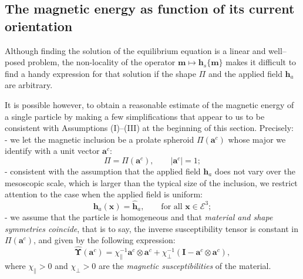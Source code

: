 \documentclass[oneside]{article}
\begin{document}
\subsection{The magnetic energy as function of its current orientation}

Although finding the solution of the equilibrium equation is a linear and well--posed problem, the non-locality of the operator $\bm m\mapsto\bm h_s\{\bm m\}$ makes it difficult to find a handy expression for that solution if the shape $\Pi$ and the applied field $\bm h_a$ are arbitrary. 


It is possible however, to obtain a reasonable estimate of the magnetic energy of a single particle by making a few simplifications that appear to us to be consistent with Assumptions (I)--(III) at the beginning of this section. Precisely: \\
%
- we let the magnetic inclusion be a prolate spheroid $\Pi(\bm a^c)$ whose major we identify with a unit vector $\bm a^c$:
\begin{equation}\label{eq:6}
\Pi=\Pi(\bm a^c),\qquad |\bm a^c|=1;
\end{equation}
\noindent - consistent with the assumption that the applied field $\bm h_a$ does not vary over the mesoscopic scale, which is larger than the typical size of the inclusion, we restrict attention to the case when the applied field is uniform:
\begin{equation}\label{eq:55}
\bm h_a(\bm x)=\widehat{\bm h}_a,\qquad \text{for all  }\bm x\in\mathscr E^3;
\end{equation}
\noindent - we assume that the particle is homogeneous and that \emph{material and shape symmetries coincide}, that is to say, the inverse susceptibility tensor is constant in $\Pi(\bm a^c)$, and given by the following expression:
\begin{equation}\label{eq:1010}
\widehat{\bm\Upsilon}(\bm a^c)=\chi_\parallel^{-1}\bm a^c\otimes\bm a^c+\chi_\perp^{-1}(\bm I-\bm a^c\otimes\bm a^c),
\end{equation}
where $\chi_\parallel>0$ and $\chi_\perp>0$ are the \emph{magnetic susceptibilities} of the material.
\end{document}

